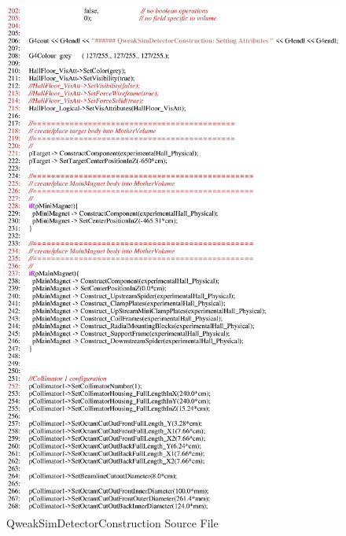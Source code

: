 \begin{figure}[ht]
  \hspace{0cm}
  \includegraphics[scale=0.8]{./figures4/QweakSimDetectorConstruction.cc-p4.eps}
  \caption{QweakSimDetectorConstruction Source File}
           \label{fig:V-SC-8}
\end{figure}
\clearpage

